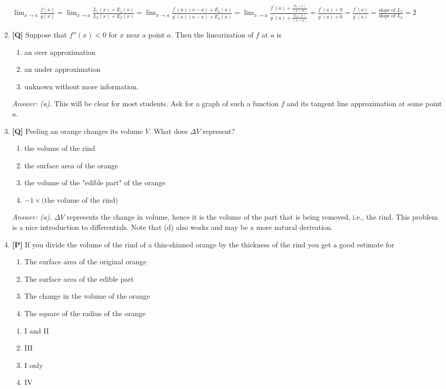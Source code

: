 \documentclass[12pt]{article}
\begin{document}
\begin{enumerate}
$\displaystyle{\lim_{x\rightarrow 
a}  \frac{f(x)}{g(x)}}=\displaystyle{\lim_{x\rightarrow 
a}  \frac{L_1(x)+E_1(x)}{L_2(x)+E_2(x)}}=\displaystyle{\lim_{x\rightarrow 
a} 
\frac{f^{\prime}(a)(x-a)+E_1(x)}{g^{\prime}(a)(x-a)+E_2(x)}}=\displaystyle{\lim_
{x\rightarrow 
a} 
\frac{f^{\prime}(a)+\frac{E_1(x)}{(x-a)}}{g^{\prime}(a)+\frac{E_2(x)}{(x-a)}}}=
\frac{f^{\prime}(a)+0}{g^{\prime}(a)+0}=
\frac{f^{\prime}(a)}{g^{\prime}(a)}=\frac{\mbox{slope 
of }L_1}{\mbox{slope of }L_2}=2$

\bigskip

\item {\bf [Q]} Suppose that $f''(x)<0$ for $x$ near a point $a$.  Then the
linearization of $f$ at $a$ is 
\begin{enumerate}
\item an over approximation
\item an under approximation
\item unknown without more information.
\end{enumerate}

{\it Answer: (a).} This will be clear for most students. Ask for a graph of such a function $f$ and its tangent line approximation at some point $a$.

\bigskip

\item {\bf [Q]} Peeling an orange changes its volume $V$.  What  does $\Delta V$
represent? 
\begin{enumerate}
\item the volume of the rind
\item the surface area of the orange
\item the volume of the "edible part" of the orange
\item $-1\times\mbox{(the volume of the rind)}$
\end{enumerate}

{\it Answer: (a).} $\Delta V$ represents the change in volume, 
hence it is the volume of the part that is being removed, i.e., 
the rind. This problem is a nice introduction to differentials.
Note that (d) also works and may be a more natural derivation.

\bigskip

\item {\bf [P]} If you divide the volume of the rind of a thin-skinned orange
by the thickness of the rind you get a good estimate for
\renewcommand{\theenumii}{\Roman{enumii}}
\begin{enumerate}
\item The surface area of the original orange
\item The surface area of the edible part
\item The change in the volume of the orange
\item The square of the radius of the orange
\end{enumerate}
\renewcommand{\theenumii}{\alph{enumii}}
\begin{enumerate}
\item I and II
\item III
\item I only
\item IV
\end{enumerate}


\end{enumerate}
\end{document}
